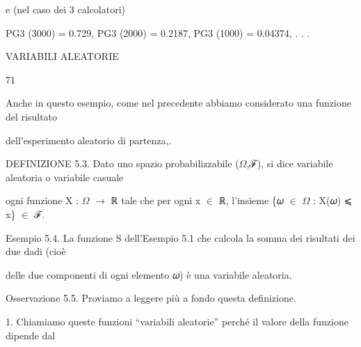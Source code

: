 \documentclass[a4paper,portrait,12pt]{article}
\begin{document}
\begin{flushleft}
e (nel caso dei 3 calcolatori)
\end{flushleft}


\begin{flushleft}
PG3 (3000) = 0.729, PG3 (2000) = 0.2187, PG3 (1000) = 0.04374, . . .
\end{flushleft}





\begin{flushleft}
\newpage
VARIABILI ALEATORIE
\end{flushleft}





71





\begin{flushleft}
Anche in questo esempio, come nel precedente abbiamo considerato una funzione del risultato
\end{flushleft}


\begin{flushleft}
dell'esperimento aleatorio di partenza,.
\end{flushleft}


\begin{flushleft}
DEFINIZIONE 5.3. Dato uno spazio probabilizzabile ($\Omega$,ℱ), si dice variabile aleatoria o variabile casuale
\end{flushleft}


\begin{flushleft}
ogni funzione X : $\Omega$ $\rightarrow$ ℝ tale che per ogni x $\in$ ℝ, l'insieme \{𝜔 $\in$ $\Omega$ : X(𝜔) ⩽ x\} $\in$ ℱ.
\end{flushleft}


\begin{flushleft}
Esempio 5.4. La funzione S dell'Esempio 5.1 che calcola la somma dei risultati dei due dadi (cio\`{e}
\end{flushleft}


\begin{flushleft}
delle due componenti di ogni elemento 𝜔) \`{e} una variabile aleatoria.
\end{flushleft}


\begin{flushleft}
Osservazione 5.5. Proviamo a leggere più a fondo questa definizione.
\end{flushleft}


\begin{flushleft}
1. Chiamiamo queste funzioni {``}variabili aleatorie'' perch\'{e} il valore della funzione dipende dal
\end{flushleft}
\end{document}
